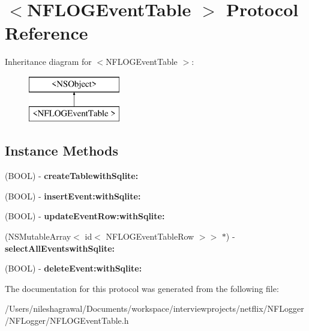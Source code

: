\hypertarget{protocol_n_f_l_o_g_event_table_01-p}{}\section{$<$N\+F\+L\+O\+G\+Event\+Table $>$ Protocol Reference}
\label{protocol_n_f_l_o_g_event_table_01-p}
Inheritance diagram for $<$N\+F\+L\+O\+G\+Event\+Table $>$\+:\begin{figure}[H]
\begin{center}
\leavevmode
\includegraphics[height=2.000000cm]{protocol_n_f_l_o_g_event_table_01-p}
\end{center}
\end{figure}
\subsection*{Instance Methods}
\begin{DoxyCompactItemize}
\item 
\mbox{\label{protocol_n_f_l_o_g_event_table_01-p_a4548281e6c33bf710a5ed21cb501f375}} 
(B\+O\+OL) -\/ {\bfseries create\+Tablewith\+Sqlite\+:}
\item 
\mbox{\label{protocol_n_f_l_o_g_event_table_01-p_a5207d766aeab95615fee7061d3c5aa57}} 
(B\+O\+OL) -\/ {\bfseries insert\+Event\+:with\+Sqlite\+:}
\item 
\mbox{\label{protocol_n_f_l_o_g_event_table_01-p_a99968b8ef1cefcefe7cf93ecf701df05}} 
(B\+O\+OL) -\/ {\bfseries update\+Event\+Row\+:with\+Sqlite\+:}
\item 
\mbox{\label{protocol_n_f_l_o_g_event_table_01-p_a6f739f337cfe83061fd3ce5dac2aff9a}} 
(N\+S\+Mutable\+Array$<$ id$<$ N\+F\+L\+O\+G\+Event\+Table\+Row $>$$>$ $\ast$) -\/ {\bfseries select\+All\+Eventswith\+Sqlite\+:}
\item 
\mbox{\label{protocol_n_f_l_o_g_event_table_01-p_a3441d672e63f2ef47fe79b17d70535b3}} 
(B\+O\+OL) -\/ {\bfseries delete\+Event\+:with\+Sqlite\+:}
\end{DoxyCompactItemize}


The documentation for this protocol was generated from the following file\+:\begin{DoxyCompactItemize}
\item 
/\+Users/nileshagrawal/\+Documents/workspace/interviewprojects/netflix/\+N\+F\+Logger/\+N\+F\+Logger/N\+F\+L\+O\+G\+Event\+Table.\+h\end{DoxyCompactItemize}
